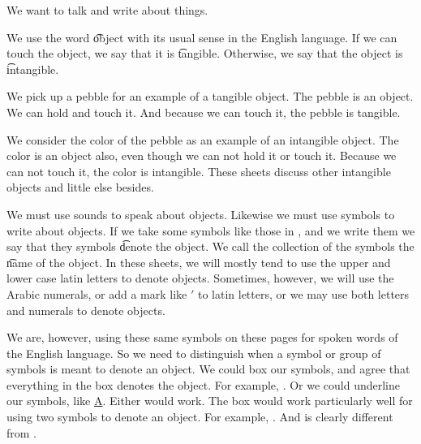 

We want to talk and write about things.


We use the word \t{object} with its usual sense in the English language.
If we can touch the object, we say that it is \t{tangible}.
Otherwise, we say that the object is \t{intangible}.


We pick up a pebble for an example of a tangible object.
The pebble is an object.
We can hold and touch it.
And because we can touch it, the pebble is tangible.

We consider the color of the pebble as an example of an intangible object.
The color is an object also, even though we can not hold it or touch it.
Because we can not touch it, the color is intangible.
These sheets discuss other intangible objects and little else besides.


We must use sounds to speak about objects.
Likewise we must use symbols to write about objects.
If we take some symbols like those in , and we write them we say that they symbols \t{denote} the object.
We call the collection of the symbols the \t{name} of the object.
In these sheets, we will mostly tend to use the upper and lower case latin letters to denote objects.
Sometimes, however, we will use the Arabic numerals, or add a mark like $'$ to latin letters, or we may use both letters and numerals to denote objects.

We are, however, using these same symbols on these pages for spoken words of the English language.
So we need to distinguish when a symbol or group of symbols is meant to denote an object.
We could box our symbols, and agree that everything in the box denotes the object.
For example, .
Or we could underline our symbols, like \underline{A}.
Either would work.
The box would work particularly well for using two symbols to denote an object.
For example, .%
And  is clearly different from .

